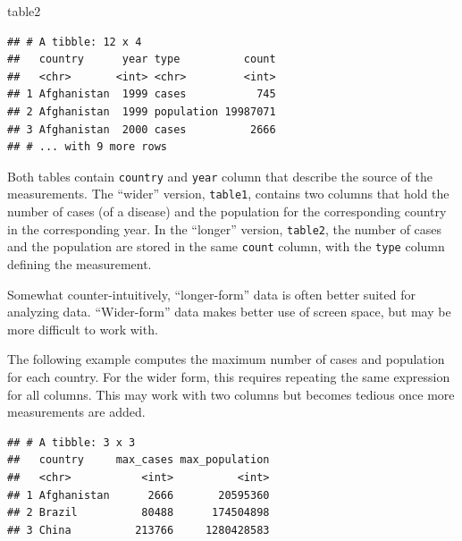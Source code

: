 \documentclass[]{book}
\newenvironment{Shaded}{}{}
\newcommand{\DataTypeTok}[1]{#1}
\newcommand{\KeywordTok}[1]{\textcolor[rgb]{0.00,0.00,1.00}{#1}}
\newcommand{\NormalTok}[1]{#1}
\newcommand{\OperatorTok}[1]{#1}
\newcommand{\StringTok}[1]{\textcolor[rgb]{0.00,0.50,0.50}{#1}}
\begin{document}
\begin{Shaded}
\begin{Highlighting}[]
\NormalTok{table2}
\end{Highlighting}
\end{Shaded}

\begin{verbatim}
## # A tibble: 12 x 4
##   country      year type          count
##   <chr>       <int> <chr>         <int>
## 1 Afghanistan  1999 cases           745
## 2 Afghanistan  1999 population 19987071
## 3 Afghanistan  2000 cases          2666
## # ... with 9 more rows
\end{verbatim}

Both tables contain \texttt{country} and \texttt{year} column that describe the source of the measurements.
The ``wider'' version, \texttt{table1}, contains two columns that hold the number of cases (of a disease) and the population for the corresponding country in the corresponding year.
In the ``longer'' version, \texttt{table2}, the number of cases and the population are stored in the same \texttt{count} column, with the \texttt{type} column defining the measurement.

Somewhat counter-intuitively, ``longer-form'' data is often better suited for analyzing data.
``Wider-form'' data makes better use of screen space, but may be more difficult to work with.

The following example computes the maximum number of cases and population for each country.
For the wider form, this requires repeating the same expression for all columns.
This may work with two columns but becomes tedious once more measurements are added.

\begin{Shaded}
\end{Shaded}

\begin{verbatim}
## # A tibble: 3 x 3
##   country     max_cases max_population
##   <chr>           <int>          <int>
## 1 Afghanistan      2666       20595360
## 2 Brazil          80488      174504898
## 3 China          213766     1280428583
\end{verbatim}
\end{document}
